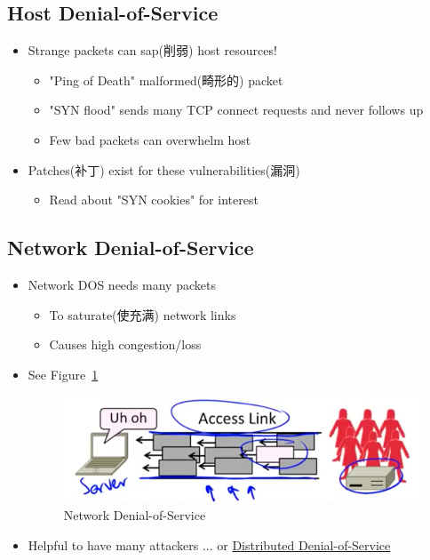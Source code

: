\documentclass[12pt]{ctexart}   %
\begin{document}
	\subsection{Host Denial-of-Service}
	\begin{itemize}
		\item Strange packets can sap(削弱) host resources!
		\begin{itemize}
			\item "Ping of Death" malformed(畸形的) packet
			\item "SYN flood" sends many TCP connect requests and never follows up
			\item Few bad packets can overwhelm host
		\end{itemize}

		\item Patches(补丁) exist for these vulnerabilities(漏洞)
		\begin{itemize}
			\item Read about "SYN cookies" for interest
		\end{itemize}
	\end{itemize}

	\subsection{Network Denial-of-Service}
	\begin{itemize}
		\item Network DOS needs many packets
		\begin{itemize}
			\item To saturate(使充满) network links
			\item Causes high congestion/loss
		\end{itemize}
		\item See Figure~\ref{fig:10-9-2}
		  
		\begin{figure}[h!] %
		\centering
		\includegraphics[scale=0.7]{images/10-9-2}
		\caption{Network Denial-of-Service}
		\label{fig:10-9-2}
		\end{figure}

		\item Helpful to have many attackers ... or \underline{Distributed Denial-of-Service}
	\end{itemize}
\end{document}
